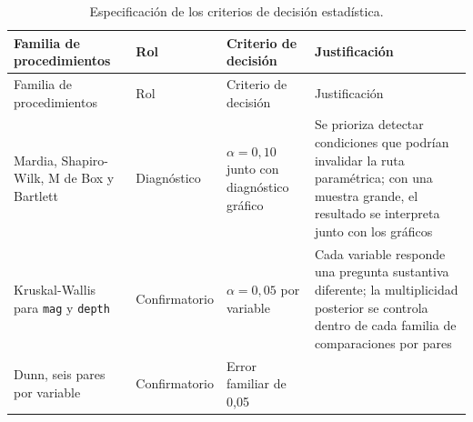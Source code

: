 \documentclass[
  spanish,
  letterpaper,
  DIV=11,
  numbers=noendperiod]{scrartcl}
\begin{document}
\begin{longtable}[]{@{}
  >{\raggedright\arraybackslash}p{}
  >{\raggedright\arraybackslash}p{}
  >{\raggedright\arraybackslash}p{}
  >{\raggedright\arraybackslash}p{}@{}}
\caption{Especificación de los criterios de decisión
estadística.}\label{tbl-politica-decision}\tabularnewline
\toprule\noalign{}
\begin{minipage}[b]{\linewidth}\raggedright
Familia de procedimientos
\end{minipage} & \begin{minipage}[b]{\linewidth}\raggedright
Rol
\end{minipage} & \begin{minipage}[b]{\linewidth}\raggedright
Criterio de decisión
\end{minipage} & \begin{minipage}[b]{\linewidth}\raggedright
Justificación
\end{minipage} \\
\midrule\noalign{}
\endfirsthead
\toprule\noalign{}
\begin{minipage}[b]{\linewidth}\raggedright
Familia de procedimientos
\end{minipage} & \begin{minipage}[b]{\linewidth}\raggedright
Rol
\end{minipage} & \begin{minipage}[b]{\linewidth}\raggedright
Criterio de decisión
\end{minipage} & \begin{minipage}[b]{\linewidth}\raggedright
Justificación
\end{minipage} \\
\midrule\noalign{}
\endhead
\bottomrule\noalign{}
\endlastfoot
Mardia, Shapiro-Wilk, M de Box y Bartlett & Diagnóstico &
\(\alpha=0{,}10\) junto con diagnóstico gráfico & Se prioriza detectar
condiciones que podrían invalidar la ruta paramétrica; con una muestra
grande, el resultado se interpreta junto con los gráficos \\
Kruskal-Wallis para \texttt{mag} y \texttt{depth} & Confirmatorio &
\(\alpha=0{,}05\) por variable & Cada variable responde una pregunta
sustantiva diferente; la multiplicidad posterior se controla dentro de
cada familia de comparaciones por pares \\
Dunn, seis pares por variable & Confirmatorio & Error familiar de 0,05

\end{longtable}
\end{document}
